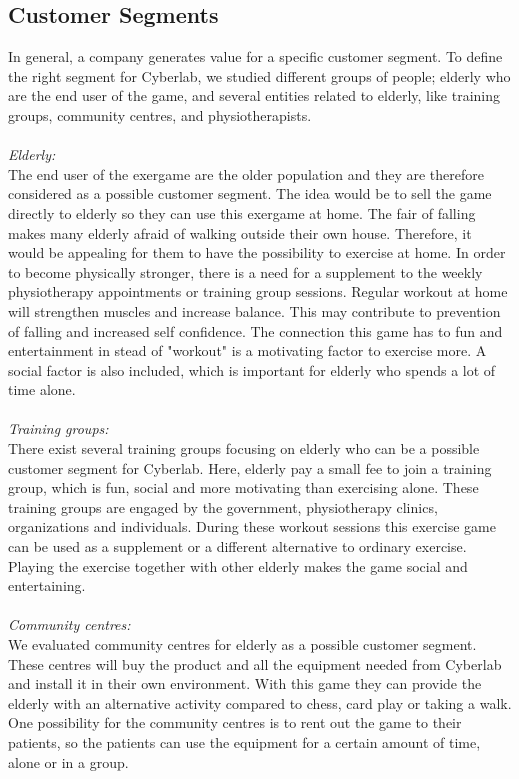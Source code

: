 \subsection{Customer Segments}
In general, a company generates value for a specific customer segment. To define the right segment for Cyberlab, we studied different groups of people; elderly who are the end user of the game, and several entities related to elderly, like training groups, community centres, and physiotherapists.\\ \\ 
\emph{Elderly:}\\ 
The end user of the exergame are the older population and they are therefore considered as a possible customer segment. The idea would be to sell the game directly to elderly so they can use this exergame at home. The fair of falling makes many elderly afraid of walking outside their own house. Therefore, it would be appealing for them to have the possibility to exercise at home. In order to become physically stronger, there is a need for a supplement to the weekly physiotherapy appointments or training group sessions. Regular workout at home will strengthen muscles and increase balance.  This may contribute to prevention of falling and increased self confidence. The connection this game has to fun and entertainment in stead of "workout" is a motivating factor to exercise more. A social factor is also included, which is important for elderly who spends a lot of time alone. \\ \\
\emph{Training groups:}\\ 
There exist several training groups focusing on elderly who can be a possible customer segment for Cyberlab. Here, elderly pay a small fee to join a training group, which is fun, social and more motivating than exercising alone. These training groups are engaged by the government, physiotherapy clinics, organizations and individuals. During these workout sessions this exercise game can be used as a supplement or a different alternative to ordinary exercise. Playing the exercise together with other elderly makes the game social and entertaining. \\ \\
\emph{Community centres:} \\
We evaluated community centres for elderly as a possible customer segment. These centres will buy the product and all the equipment needed from Cyberlab and install it in their own environment. With this game they can provide the elderly with an alternative activity compared to chess, card play or taking a walk. One possibility for the community centres is to rent out the game to their patients, so the patients can use the equipment for a certain amount of time, alone or in a group. \\ \\
